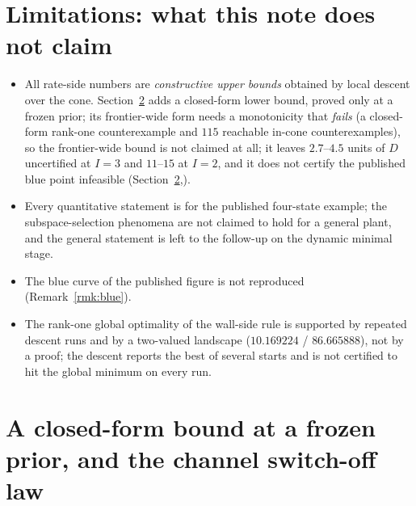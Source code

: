 \documentclass[journal]{IEEEtran}
\theoremstyle{remark}
\begin{document}
\section{Limitations: what this note does not claim}
\begin{itemize}
 \item All rate-side numbers are \emph{constructive upper bounds} obtained by
 local descent over the cone. Section~\ref{sec:waterfill} adds a
 closed-form lower bound, proved only at a frozen prior; its frontier-wide
 form needs a monotonicity that \emph{fails} (a closed-form rank-one
 counterexample and $115$ reachable in-cone counterexamples), so the
 frontier-wide bound is not claimed at all; it leaves
 $2.7$--$4.5$ units of $D$ uncertified at $I=3$ and $11$--$15$ at $I=2$,
 and it does not certify the published blue point infeasible
 (Section~\ref{sec:waterfill},).
 \item Every quantitative statement is for the published four-state example;
 the subspace-selection phenomena are not claimed to hold for a general
 plant, and the general statement is left to the follow-up on the dynamic
 minimal stage.
 \item The blue curve of the published figure is not reproduced
 (Remark~\ref{rmk:blue}).
 \item The rank-one global optimality of the wall-side rule is supported by
 repeated descent runs and by a two-valued landscape
 ($10.169224$ / $86.665888$), not by a proof; the descent reports the
 best of several starts and is not certified to hit the global minimum on
 every run.
\end{itemize}

\section{A closed-form bound at a frozen prior, and the channel switch-off law}
\label{sec:waterfill}
\end{document}

